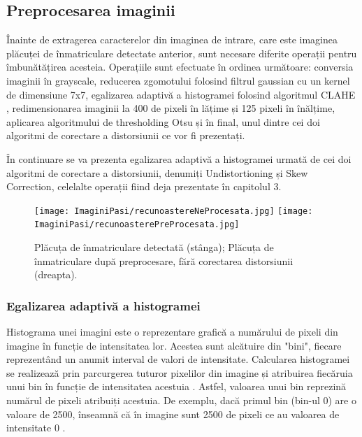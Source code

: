 \documentclass[12pt]{article}
\begin{document}
\subsection{Preprocesarea imaginii}

\^{I}nainte de extragerea caracterelor din imaginea de intrare, care este imaginea pl\u{a}cuței de \^{i}nmatriculare detectate anterior, sunt necesare diferite operații pentru \^{i}mbun\u{a}t\u{a}țirea acesteia. Operațiile sunt efectuate \^{i}n ordinea urm\u{a}toare: conversia imaginii \^{i}n grayscale, reducerea zgomotului folosind filtrul gaussian cu un kernel de dimensiune 7x7, egalizarea adaptiv\u{a} a histogramei folosind algoritmul CLAHE \cite{clahe}, redimensionarea imaginii la 400 de pixeli \^{i}n l\u{a}țime și 125 pixeli \^{i}n \^{i}n\u{a}lțime, aplicarea algoritmului de thresholding Otsu și \^{i}n final, unul dintre cei doi algoritmi de corectare a distorsiunii ce vor fi prezentați. 

\^{I}n continuare se va prezenta egalizarea adaptiv\u{a} a histogramei urmat\u{a} de cei doi algoritmi de corectare a distorsiunii, denumiți Undistortioning și Skew Correction, celelalte operații fiind deja prezentate \^{i}n capitolul 3.

\begin{figure}[H]
  \centering
  \texttt{[image: ImaginiPasi/recunoastereNeProcesata.jpg]}\hfill
    \texttt{[image: ImaginiPasi/recunoasterePreProcesata.jpg]}
  \caption{Pl\u{a}cuța de \^{i}nmatriculare detectat\u{a} (st\^{a}nga); Pl\u{a}cuța de \^{i}nmatriculare dup\u{a} preprocesare, f\u{a}r\u{a} corectarea distorsiunii (dreapta).}
  \label{fig:recunoastere_preprocesare}
\end{figure}

\subsubsection{Egalizarea adaptiv\u{a} a histogramei}

Histograma unei imagini este o reprezentare grafic\u{a} a num\u{a}rului de pixeli din imagine \^{i}n funcție de intensitatea lor. Acestea sunt alc\u{a}tuire din "bini", fiecare reprezent\^{a}nd un anumit interval de valori de intensitate. Calcularea histogramei se realizeaz\u{a} prin parcurgerea tuturor pixelilor din imagine și atribuirea fiec\u{a}ruia unui bin \^{i}n funcție de intensitatea acestuia \cite{hist}. Astfel, valoarea unui bin reprezin\u{a} num\u{a}rul de pixeli atribuiți acestuia. De exemplu, dac\u{a} primul bin (bin-ul 0) are o valoare de 2500, \^{i}nseamn\u{a} c\u{a} \^{i}n imagine sunt 2500 de pixeli ce au valoarea de intensitate 0 \cite{histogram}.
\end{document}
